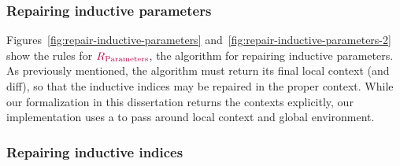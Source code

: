 \subsubsection{Repairing inductive parameters}

Figures~\ref{fig:repair-inductive-parameters}
and~\ref{fig:repair-inductive-parameters-2} show the rules for
$\textcolor{purple}{R_{\text{Parameters}}}{}$, the algorithm for repairing inductive parameters.  As
previously mentioned, the algorithm must return its final local context (and
diff), so that the inductive indices may be repaired in the proper context.
While our formalization in this dissertation returns the contexts explicitly,
our implementation uses a  to pass around local context and
global environment.






\subsubsection{Repairing inductive indices}



% 

% 
